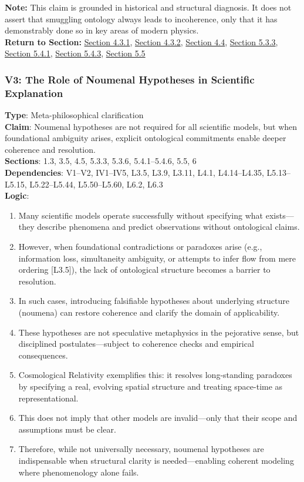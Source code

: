 \documentclass[12pt]{book}
\begin{document}
\textbf{Note:} This claim is grounded in historical and structural diagnosis. It does not assert that smuggling ontology always leads to incoherence, only that it has demonstrably done so in key areas of modern physics.\\
\textbf{Return to Section:} \hyperref[sec:4.3.1]{Section 4.3.1}, \hyperref[sec:4.3.2]{Section 4.3.2}, \hyperref[sec:4.4]{Section 4.4}, \hyperref[sec:5.3.3]{Section 5.3.3}, \hyperref[sec:5.4.1]{Section 5.4.1}, \hyperref[sec:5.4.3]{Section 5.4.3}, \hyperref[sec:5.5]{Section 5.5}

\subsubsection*{V3: The Role of Noumenal Hypotheses in Scientific Explanation}
\label{appendix:V3}
\textbf{Type}: Meta-philosophical clarification \\
\textbf{Claim}: Noumenal hypotheses are not required for all scientific models, but when foundational ambiguity arises, explicit ontological commitments enable deeper coherence and resolution. \\
\textbf{Sections}: 1.3, 3.5, 4.5, 5.3.3, 5.3.6, 5.4.1–5.4.6, 5.5, 6 \\
\textbf{Dependencies}: V1–V2, IV1–IV5, L3.5, L3.9, L3.11, L4.1, L4.14–L4.35, L5.13–L5.15, L5.22–L5.44, L5.50–L5.60, L6.2, L6.3 \\
\textbf{Logic}:
\begin{enumerate}
    \item Many scientific models operate successfully without specifying what exists---they describe phenomena and predict observations without ontological claims.
    \item However, when foundational contradictions or paradoxes arise (e.g., information loss, simultaneity ambiguity, or attempts to infer flow from mere ordering [L3.5]), the lack of ontological structure becomes a barrier to resolution.
    \item In such cases, introducing falsifiable hypotheses about underlying structure (noumena) can restore coherence and clarify the domain of applicability.
    \item These hypotheses are not speculative metaphysics in the pejorative sense, but disciplined postulates---subject to coherence checks and empirical consequences.
    \item Cosmological Relativity exemplifies this: it resolves long-standing paradoxes by specifying a real, evolving spatial structure and treating space-time as representational.
    \item This does not imply that other models are invalid---only that their scope and assumptions must be clear.
    \item Therefore, while not universally necessary, noumenal hypotheses are indispensable when structural clarity is needed---enabling coherent modeling where phenomenology alone fails.
\end{enumerate}
\end{document}
